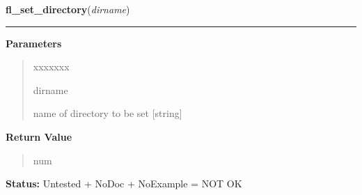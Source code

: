     \label{xformslib:library:fl_set_directory}

    \vspace{0.5ex}

\hspace{.8\funcindent}\begin{boxedminipage}{\funcwidth}

    \raggedright \textbf{fl\_set\_directory}(\textit{dirname})

    \vspace{-1.5ex}

    \rule{\textwidth}{0.5\fboxrule}
\setlength{\parskip}{2ex}
\setlength{\parskip}{1ex}
      \textbf{Parameters}
      \vspace{-1ex}

      \begin{quote}
        \begin{Ventry}{xxxxxxx}

          \item[dirname]

          name of directory to be set [string]

        \end{Ventry}

      \end{quote}

      \textbf{Return Value}
    \vspace{-1ex}

      \begin{quote}
      num

      \end{quote}

\textbf{Status:} Untested + NoDoc + NoExample = NOT OK



    \end{boxedminipage}

    \label{xformslib:library:fl_set_pattern}

    \vspace{0.5ex}


